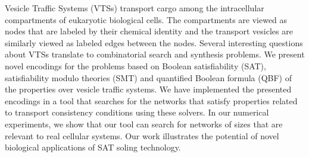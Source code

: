 Vesicle Traffic Systems (VTSs) transport cargo among the intracellular compartments of eukaryotic biological cells.
%
The compartments are viewed as nodes that are labeled by their chemical identity and the transport vesicles are similarly viewed as labeled edges between the nodes.
%
Several interesting questions about VTSs translate to combinatorial search and synthesis problems. 
%
We present novel encodings for the problems
based on Boolean satisfiability (SAT), satisfiability modulo theories (SMT) and
quantified Boolean formula (QBF) of the properties over vesicle traffic systems.
%
We have implemented the presented encodings in a tool that searches for the networks that satisfy properties related to transport consistency conditions using these solvers. 
%
In our numerical experiments, we show that our tool can search for networks of sizes that are relevant to real cellular systems.
%
Our work illustrates the potential of novel biological applications of
SAT soling technology.

%
%
%

